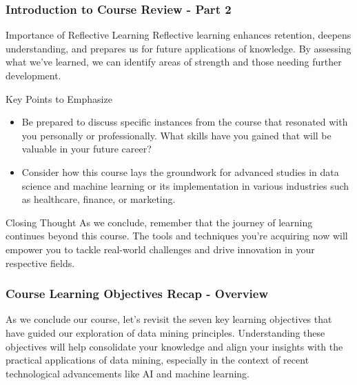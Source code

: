 \documentclass[aspectratio=169]{beamer}
\begin{document}
\begin{frame}[fragile]
    \frametitle{Introduction to Course Review - Part 2}
    \begin{block}{Importance of Reflective Learning}
        Reflective learning enhances retention, deepens understanding, and prepares us for future applications of knowledge. By assessing what we've learned, we can identify areas of strength and those needing further development.
    \end{block}

    \begin{block}{Key Points to Emphasize}
        \begin{itemize}
            \item Be prepared to discuss specific instances from the course that resonated with you personally or professionally. What skills have you gained that will be valuable in your future career?
            \item Consider how this course lays the groundwork for advanced studies in data science and machine learning or its implementation in various industries such as healthcare, finance, or marketing.
        \end{itemize}
    \end{block}

    \begin{block}{Closing Thought}
        As we conclude, remember that the journey of learning continues beyond this course. The tools and techniques you're acquiring now will empower you to tackle real-world challenges and drive innovation in your respective fields.
    \end{block}
\end{frame}

\begin{frame}[fragile]
    \frametitle{Course Learning Objectives Recap - Overview}
    As we conclude our course, let's revisit the seven key learning objectives that have guided our exploration of data mining principles. 
    Understanding these objectives will help consolidate your knowledge and align your insights with the practical applications of data mining, especially in the context of recent technological advancements like AI and machine learning.
\end{frame}
\end{document}
